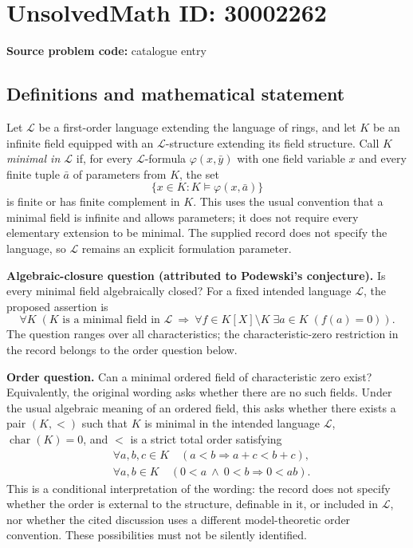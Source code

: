 \documentclass[11pt]{article}
\begin{document}
\section*{UnsolvedMath ID: 30002262}
\textbf{Source problem code:} catalogue entry
\subsection{Definitions and mathematical statement}
Let \(\mathcal L\) be a first-order language extending the language of rings, and let \(K\) be an infinite field equipped with an \(\mathcal L\)-structure extending its field structure. Call \(K\) \emph{minimal in \(\mathcal L\)} if, for every \(\mathcal L\)-formula \(\varphi(x,\bar y)\) with one field variable \(x\) and every finite tuple \(\bar a\) of parameters from \(K\), the set
\[
\{x\in K:K\models\varphi(x,\bar a)\}
\]
is finite or has finite complement in \(K\). This uses the usual convention that a minimal field is infinite and allows parameters; it does not require every elementary extension to be minimal. The supplied record does not specify the language, so \(\mathcal L\) remains an explicit formulation parameter.

\textbf{Algebraic-closure question (attributed to Podewski's conjecture).} Is every minimal field algebraically closed? For a fixed intended language \(\mathcal L\), the proposed assertion is
\[
\forall K\;\left(K\text{ is a minimal field in }\mathcal L\ \Longrightarrow\ \forall f\in K[X]\setminus K\;\exists a\in K\;(f(a)=0)\right).
\]
The question ranges over all characteristics; the characteristic-zero restriction in the record belongs to the order question below.

\textbf{Order question.} Can a minimal ordered field of characteristic zero exist? Equivalently, the original wording asks whether there are no such fields. Under the usual algebraic meaning of an ordered field, this asks whether there exists a pair \((K,<)\) such that \(K\) is minimal in the intended language \(\mathcal L\), \(\operatorname{char}(K)=0\), and \(<\) is a strict total order satisfying
\[
\begin{aligned}
&\forall a,b,c\in K\quad (a<b\Longrightarrow a+c<b+c),\\
&\forall a,b\in K\quad (0<a\ \land\ 0<b\Longrightarrow 0<ab).
\end{aligned}
\]
This is a conditional interpretation of the wording: the record does not specify whether the order is external to the structure, definable in it, or included in \(\mathcal L\), nor whether the cited discussion uses a different model-theoretic order convention. These possibilities must not be silently identified.
\end{document}
